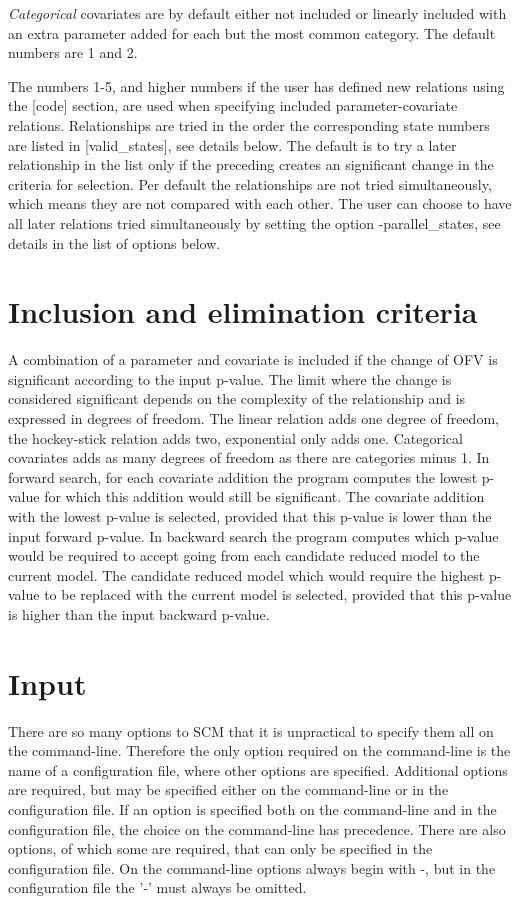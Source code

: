 \documentclass[a4paper,12pt]{article}
\begin{document}
\emph{Categorical} covariates are by default either not included or linearly included with an extra parameter added for each but the most common category. The default numbers are 1 and 2.

The numbers 1-5, and higher numbers if the user has defined new relations using the [code] section, are used when specifying included parameter-covariate relations. Relationships are tried in the order the corresponding state numbers are listed in [valid\_states], see details below. The default is to try a later relationship in the list only if the preceding creates an significant change in the criteria for selection. Per default the relationships are not tried simultaneously, which means they are not compared with each other. The user can choose to have all later relations tried simultaneously by setting the option -parallel\_states, see details in the list of options below.

\section{Inclusion and elimination criteria}
A combination of a parameter and covariate is included if the change of OFV is significant according to the input p-value. The limit where the change is considered significant depends on the complexity of the relationship and is expressed in degrees of freedom. The linear relation adds one degree of freedom, the hockey-stick relation adds two, exponential only adds one. Categorical covariates adds as many degrees of freedom as there are categories minus 1. In forward search, for each covariate addition the program computes the lowest p-value for which this addition would still be significant. The covariate addition with the lowest p-value is selected, provided that this p-value is lower than the input forward p-value. In backward search the program computes which p-value would be required to accept going from each candidate reduced model to the current model. The candidate reduced model which would require the highest p-value to be replaced with the current model is selected, provided that this p-value is higher than the input backward p-value. 

\section{Input}
There are so many options to SCM that it is unpractical to specify them all on the command-line. Therefore the only option required on the command-line is the name of a configuration file, where other options are specified. Additional options are required, but may be specified either on the command-line or in the configuration file. If an option is specified both on the command-line and in the configuration file, the choice on the command-line has precedence. There are also options, of which some are required, that can only be specified in the configuration file. On the command-line options always begin with -, but in the configuration file the '-' must always be omitted. 
\end{document}
